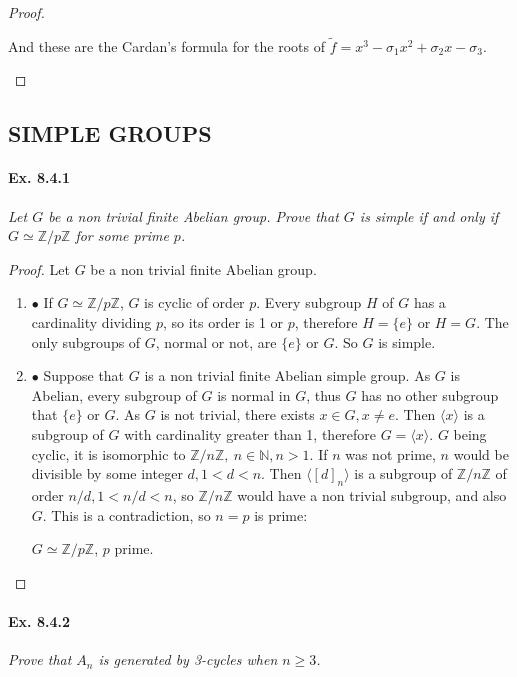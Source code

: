 \documentclass[11pt,a4paper]{article}
\newcommand{\be} {\begin{enumerate}}
\newcommand{\ee} {\end{enumerate}}
\newcommand{\Z}{\mathbb{Z}}
\newcommand{\N}{\mathbb{N}}
\begin{document}
\begin{proof}
\begin{enumerate}
And these are the Cardan's formula for the roots of $\tilde{f} = x^3 - \sigma_1 x^2+\sigma_2 x -\sigma_3$.
\end{enumerate}
\end{proof}

\subsection{SIMPLE GROUPS}

\paragraph{Ex. 8.4.1}

{\it Let $G$ be a non trivial finite Abelian group. Prove that $G$ is simple if and only if $G\simeq \Z/p\Z$ for some prime $p$.
}

\begin{proof}
Let $G$ be a non trivial finite Abelian group.
\be
\item[$\bullet$] If $G \simeq \Z/p\Z$, $G$ is cyclic of order $p$. Every subgroup $H$ of $G$ has a cardinality dividing $p$, so its order is 1 or $p$, therefore $H = \{e\}$ or $H = G$. The only subgroups of $G$, normal or not, are $\{e\}$ or $G$. So $G$ is simple.

\item[$\bullet$] Suppose that $G$ is a non trivial finite Abelian simple group. As $G$ is Abelian, every subgroup of $G$ is normal in $G$, thus $G$ has no other subgroup that $\{e\}$ or $G$. As $G$ is not trivial, there exists $x \in G, x\neq e$. Then $\langle x \rangle$ is a subgroup of $G$ with cardinality greater than 1, therefore $G = \langle x \rangle$. $G$ being cyclic, it is isomorphic to $\Z/n\Z,\ n\in \N, n>1$. If  $n$ was not prime, $n$ would be divisible by some integer $d, 1<d<n$. Then $\langle [d]_n \rangle$ is a subgroup of $\Z/n\Z$ of order $n/d, 1<n/d<n$, so $\Z/n\Z$ would have a non trivial subgroup, and also $G$. This is a contradiction, so $n=p$ is prime:
\begin{center}
$G\simeq \Z/p\Z$, $p$ prime. 
\end{center}
\ee
\end{proof}

\paragraph{Ex. 8.4.2}

{\it Prove that $A_n$ is generated by 3-cycles when $n\geq 3$.
}
\end{document}
